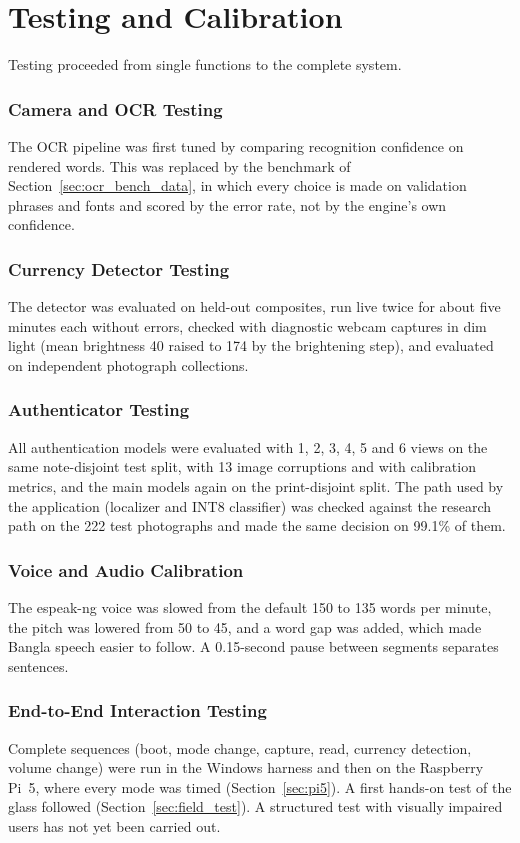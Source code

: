 \section{Testing and Calibration}
Testing proceeded from single functions to the complete system.

\subsubsection{Camera and OCR Testing}
The OCR pipeline was first tuned by comparing recognition confidence on rendered words. This was replaced by the benchmark of Section~\ref{sec:ocr_bench_data}, in which every choice is made on validation phrases and fonts and scored by the error rate, not by the engine's own confidence.

\subsubsection{Currency Detector Testing}
The detector was evaluated on held-out composites, run live twice for about five minutes each without errors, checked with diagnostic webcam captures in dim light (mean brightness 40 raised to 174 by the brightening step), and evaluated on independent photograph collections.

\subsubsection{Authenticator Testing}
All authentication models were evaluated with 1, 2, 3, 4, 5 and 6 views on the same note-disjoint test split, with 13 image corruptions and with calibration metrics, and the main models again on the print-disjoint split. The path used by the application (localizer and INT8 classifier) was checked against the research path on the 222 test photographs and made the same decision on 99.1\% of them.

\subsubsection{Voice and Audio Calibration}
The espeak-ng voice was slowed from the default 150 to 135 words per minute, the pitch was lowered from 50 to 45, and a word gap was added, which made Bangla speech easier to follow. A 0.15-second pause between segments separates sentences.

\subsubsection{End-to-End Interaction Testing}
Complete sequences (boot, mode change, capture, read, currency detection, volume change) were run in the Windows harness and then on the Raspberry Pi~5, where every mode was timed (Section~\ref{sec:pi5}). A first hands-on test of the glass followed (Section~\ref{sec:field_test}). A structured test with visually impaired users has not yet been carried out.

